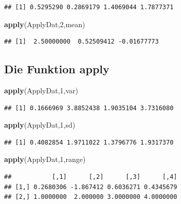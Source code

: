 \documentclass[]{article}
\newenvironment{Shaded}{\begin{snugshade}}{\end{snugshade}}
\newcommand{\KeywordTok}[1]{\textcolor[rgb]{0.13,0.29,0.53}{\textbf{{#1}}}}
\newcommand{\DecValTok}[1]{\textcolor[rgb]{0.00,0.00,0.81}{{#1}}}
\newcommand{\NormalTok}[1]{{#1}}
\begin{document}
\begin{verbatim}
## [1] 0.5295290 0.2869179 1.4069044 1.7877371
\end{verbatim}

\begin{Shaded}
\begin{Highlighting}[]
\KeywordTok{apply}\NormalTok{(ApplyDat,}\DecValTok{2}\NormalTok{,mean)}
\end{Highlighting}
\end{Shaded}

\begin{verbatim}
## [1]  2.50000000  0.52509412 -0.01677773
\end{verbatim}

\subsection{Die Funktion apply}\label{die-funktion-apply}

\begin{Shaded}
\begin{Highlighting}[]
\KeywordTok{apply}\NormalTok{(ApplyDat,}\DecValTok{1}\NormalTok{,var)}
\end{Highlighting}
\end{Shaded}

\begin{verbatim}
## [1] 0.1666969 3.8852438 1.9035104 3.7316080
\end{verbatim}

\begin{Shaded}
\begin{Highlighting}[]
\KeywordTok{apply}\NormalTok{(ApplyDat,}\DecValTok{1}\NormalTok{,sd)}
\end{Highlighting}
\end{Shaded}

\begin{verbatim}
## [1] 0.4082854 1.9711022 1.3796776 1.9317370
\end{verbatim}

\begin{Shaded}
\begin{Highlighting}[]
\KeywordTok{apply}\NormalTok{(ApplyDat,}\DecValTok{1}\NormalTok{,range)}
\end{Highlighting}
\end{Shaded}

\begin{verbatim}
##           [,1]      [,2]      [,3]      [,4]
## [1,] 0.2680306 -1.867412 0.6036271 0.4345679
## [2,] 1.0000000  2.000000 3.0000000 4.0000000
\end{verbatim}
\end{document}
